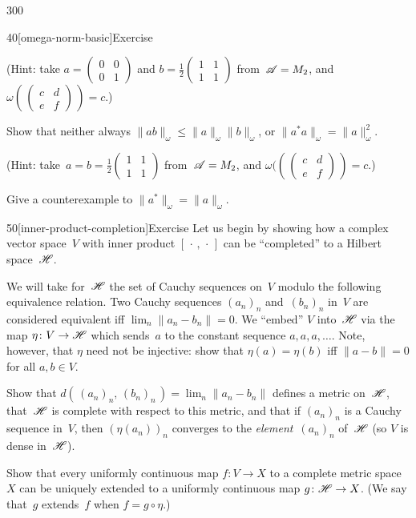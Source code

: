 \begin{parsec}{300}
\begin{point}{40}[omega-norm-basic]{Exercise}
\begin{enumerate}
(Hint:
take $a=(\begin{smallmatrix}0&0\\0&1\end{smallmatrix})$
and $b=\frac{1}{2}(\begin{smallmatrix}1&1\\1&1\end{smallmatrix})$
from~$\mathscr{A}=M_2$,
and $\omega(\,(\begin{smallmatrix}c & d\\e&f\end{smallmatrix})\,)=c$.)

Show that neither always
$\|ab\|_\omega \leq \|a\|_\omega \|b\|_\omega$,
or
$\|a^*a\|_\omega = \|a\|^2_\omega$.

(Hint: 
take~$a=b=\frac{1}{2}(\begin{smallmatrix}1 & 1 \\ 1 & 1\end{smallmatrix})$
from~$\mathscr{A}= M_2$,
and 
$\omega((\,(\begin{smallmatrix}c&d\\e&f\end{smallmatrix})\,)=c$.)

Give a counterexample to $\|a^*\|_\omega = \|a\|_\omega$.
\end{enumerate}%
\spacingfix%
\end{point}%
\begin{point}{50}[inner-product-completion]{Exercise}%
Let us begin by showing how a complex vector space~$V$
with inner product
$[\,\cdot\,,\,\cdot\,]$ can be ``completed'' to a Hilbert space~$\mathscr{H}$.

We will take for~$\mathscr{H}$ the set of Cauchy sequences on~$V$
modulo the following equivalence relation.
Two Cauchy sequences $(a_n)_n$ and~$(b_n)_n$ in~$V$
are considered equivalent
iff $\lim_n \|a_n-b_n\|=0$.
We ``embed'' $V$ into~$\mathscr{H}$ via the map $\eta\colon V\to \mathscr{H}$
which sends~$a$ to
the constant sequence $a,a,a,\dotsc$.
Note, however, that $\eta$ need not be injective:
show that $\eta(a)=\eta(b)$ iff $\|a-b\|=0$ for all $a,b\in V$.

Show that $d(\,(a_n)_n,\,(b_n)_n\,) = \lim_n \|a_n-b_n\|$
defines a metric on~$\mathscr{H}$,
that~$\mathscr{H}$ is complete with respect to this metric,
and that if $(a_n)_n$ is a Cauchy sequence in~$V$,
then $(\eta(a_n))_n$ converges to the \emph{element}~$(a_n)_n$ of~$\mathscr{H}$
(so $V$ is dense in~$\mathscr{H}$).

Show that every uniformly continuous 
map $f\colon V\to X$ to a complete metric space~$X$
can be uniquely extended to a uniformly continuous map $g\colon \mathscr{H}\to X$.
(We say that~$g$ extends~$f$ when $f=g\circ \eta$.)


\end{point}
\end{parsec}
